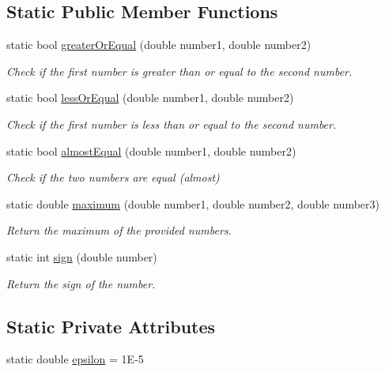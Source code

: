 \subsection*{Static Public Member Functions}
\begin{DoxyCompactItemize}
\item 
static bool \hyperlink{classmultiscale_1_1Numeric_a13ae1e2b35654937bed4c19e776ccdb5}{greater\-Or\-Equal} (double number1, double number2)
\begin{DoxyCompactList}\small\item\em Check if the first number is greater than or equal to the second number. \end{DoxyCompactList}\item 
static bool \hyperlink{classmultiscale_1_1Numeric_a7f21159a23c71c1d37e1c487e9ff815c}{less\-Or\-Equal} (double number1, double number2)
\begin{DoxyCompactList}\small\item\em Check if the first number is less than or equal to the second number. \end{DoxyCompactList}\item 
static bool \hyperlink{classmultiscale_1_1Numeric_a996dda9f7361be59b4614eace0b93f24}{almost\-Equal} (double number1, double number2)
\begin{DoxyCompactList}\small\item\em Check if the two numbers are equal (almost) \end{DoxyCompactList}\item 
static double \hyperlink{classmultiscale_1_1Numeric_a54d5578d5980315b7bade31a5655cd72}{maximum} (double number1, double number2, double number3)
\begin{DoxyCompactList}\small\item\em Return the maximum of the provided numbers. \end{DoxyCompactList}\item 
static int \hyperlink{classmultiscale_1_1Numeric_a2b3058c5ad27aaaef338a29b96cdbced}{sign} (double number)
\begin{DoxyCompactList}\small\item\em Return the sign of the number. \end{DoxyCompactList}\end{DoxyCompactItemize}
\subsection*{Static Private Attributes}
\begin{DoxyCompactItemize}
\item 
static double \hyperlink{classmultiscale_1_1Numeric_ac66cc2092ff149af068ac93aa3a6cc51}{epsilon} = 1\-E-\/5
\end{DoxyCompactItemize}



